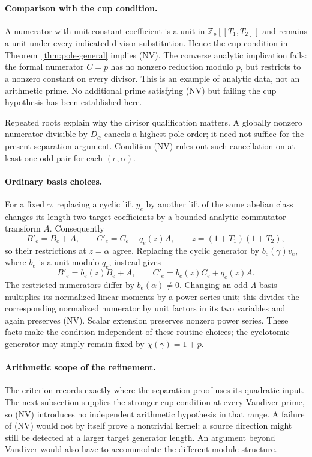 \documentclass[11pt,a4paper]{article}
\theoremstyle{definition}
\begin{document}
\paragraph{Comparison with the cup condition.}
A numerator with unit constant coefficient is a unit in $\mathbb Z_p[[T_1,T_2]]$ and remains a unit under every indicated divisor substitution. Hence the cup condition in Theorem~\ref{thm:pole-general} implies (NV). The converse analytic implication fails: the formal numerator $C=p$ has no nonzero reduction modulo $p$, but restricts to a nonzero constant on every divisor. This is an example of analytic data, not an arithmetic prime. No additional prime satisfying (NV) but failing the cup hypothesis has been established here.

Repeated roots explain why the divisor qualification matters. A globally nonzero numerator divisible by $D_\alpha$ cancels a highest pole order; it need not suffice for the present separation argument. Condition (NV) rules out such cancellation on at least one odd pair for each $(e,\alpha)$.

\paragraph{Ordinary basis choices.}
For a fixed $\gamma$, replacing a cyclic lift $y_e$ by another lift of the same abelian class changes its length-two target coefficients by a bounded analytic commutator transform $A$. Consequently
\[
 B'_e=B_e+A,\qquad C'_e=C_e+q_e(z)A,
 \qquad z=(1+T_1)(1+T_2),
\]
so their restrictions at $z=\alpha$ agree. Replacing the cyclic generator by $b_e(\gamma)v_e$, where $b_e$ is a unit modulo $q_e$, instead gives
\[
 B'_e=b_e(z)B_e+A,\qquad
 C'_e=b_e(z)C_e+q_e(z)A.
\]
The restricted numerators differ by $b_e(\alpha)\ne0$. Changing an odd $\Lambda$ basis multiplies its normalized linear moments by a power-series unit; this divides the corresponding normalized numerator by unit factors in its two variables and again preserves (NV). Scalar extension preserves nonzero power series. These facts make the condition independent of these routine choices; the cyclotomic generator may simply remain fixed by $\chi(\gamma)=1+p$.

\paragraph{Arithmetic scope of the refinement.}
The criterion records exactly where the separation proof uses its
quadratic input. The next subsection supplies the stronger cup
condition at every Vandiver prime, so (NV) introduces no independent
arithmetic hypothesis in that range. A failure of (NV) would not by
itself prove a nontrivial kernel: a source direction might still be
detected at a larger target generator length. An argument beyond
Vandiver would also have to accommodate the different module structure.
\end{document}
